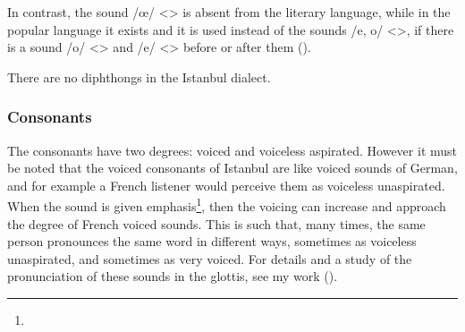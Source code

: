 In contrast, the sound /œ/ <> is absent from the literary language, while in the popular language it exists and it is used instead of the sounds /e, o/ <>, if there is a sound /o/ <> and /e/ <> before or after them (). 



\begin{table}[H]
	\centering 
	\caption{Emergence of /œ/ <> in the Istanbul dialect}
	\label{tab:Istanbul:phonology:seg:vowel:oe}
\end{table}

\begin{adjarianpage}\label{page:250}\end{adjarianpage}%


There are no diphthongs in the Istanbul dialect.

\subsubsection{Consonants}\label{section:istanbul:phono:inventory:cons}

The consonants have two degrees: voiced and voiceless aspirated. However it must be noted that the voiced consonants of Istanbul are like voiced sounds of German, and for example a French listener would perceive them as voiceless unaspirated. When the sound is given emphasis\footnote{}, then the voicing can increase and approach the degree of French voiced sounds. This is such that, many times, the same person pronounces the same word in different ways, sometimes as voiceless unaspirated, and sometimes as very voiced. For details and a study of the pronunciation of these sounds in the glottis, see my work \citep{Adjarian-1899-ArmenianExplosives} (). 

